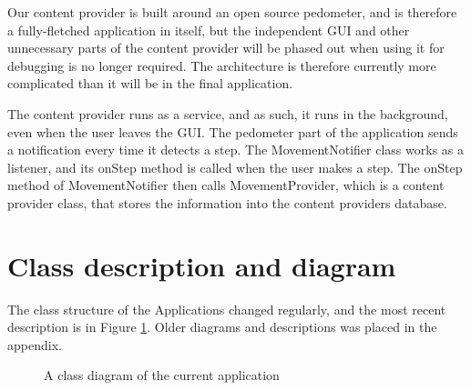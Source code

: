 Our content provider is built around an open source pedometer, and is therefore a fully-fletched application in itself, but the independent GUI and other unnecessary parts of the content provider will be phased out when using it for debugging is no longer required. The architecture is therefore currently more complicated than it will be in the final application.

The content provider runs as a service, and as such, it runs in the background, even when the user leaves the GUI. The pedometer part of the application sends a notification every time it detects a step. The MovementNotifier class works as a listener, and its onStep method is called when the user makes a step. The onStep method of MovementNotifier then calls MovementProvider, which is a content provider class, that stores the information into the content providers database.

\section{Class description and diagram}

The class structure of the Applications changed regularly, and the most recent description is in Figure \ref{fig:ClassDiagram}. Older diagrams and descriptions was placed in the appendix. 
\begin{figure}[p]
\label{fig:ClassDiagram}

\setlength\fboxsep{0pt}
\setlength\fboxrule{1pt}
\caption{A class diagram of the current application}
\end{figure}



 





